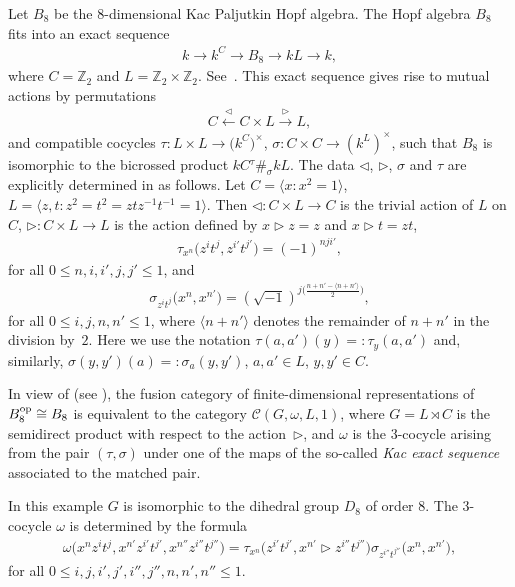 \documentclass[pdftex]{sigma}
\numberwithin{equation}{section}
\newcommand{\C}{{\mathcal C}}
\newcommand{\1}{\textbf{1}}
\begin{document}
\begin{Example}\label{kp}
Let $B_8$ be the 8-dimensional Kac Paljutkin Hopf algebra. The Hopf algebra $B_8$ f\/its into an exact sequence
\begin{gather*}
k \longrightarrow k^C \longrightarrow B_8 \longrightarrow kL \longrightarrow k,
\end{gather*}
where $C = \mathbb Z_2$ and $L = \mathbb Z_2 \times \mathbb Z_2$. See~\cite{masuoka-6-8}. This exact sequence gives rise to mutual actions by permutations
\begin{gather*}C \overset{\vartriangleleft}\longleftarrow C \times L
\overset{\vartriangleright}\longrightarrow L,\end{gather*}
and compatible cocycles $\tau\colon L \times L \to \big(k^C\big)^\times$, $\sigma\colon C \times C \to (k^L)^\times$, such that $B_8$ is isomorphic to the bicrossed product $kC {}^{\tau}\#_\sigma kL$. The data $\lhd$, $\rhd$, $\sigma$ and $\tau$ are explicitly determined in \cite[Proposition~3.11]{ma-contemp} as follows. Let $C = \langle x\colon x^2 = 1 \rangle$, $L = \langle z, t\colon z^2 = t^2 = ztz^{-1}t^{-1} = 1\rangle$. Then $\lhd\colon C\times L \to C$ is the trivial action of $L$ on $C$, $\rhd\colon C \times L \to L$ is the action def\/ined by $x \rhd z = z$ and $x\rhd t = zt$,
\begin{gather*}\tau_{x^n}\big(z^it^j, z^{i'}t^{j'}\big) = (-1)^{nji'},\end{gather*} for all $0\leq n, i, i', j, j' \leq 1$,
and
\begin{gather*}\sigma_{z^it^j}\big(x^n, x^{n'}\big) = (\sqrt{-1})^{j\big(\frac{n+n'-\langle n+n'\rangle}{2}\big)},\end{gather*}
for all $0 \leq i, j, n, n' \leq 1$, where $\langle n+n'\rangle$ denotes the remainder of $n+n'$ in the division by~$2$. Here we use the notation $\tau(a, a')(y) = : \tau_y(a, a')$ and, similarly, $\sigma(y, y')(a) = : \sigma_a(y, y')$, $a, a' \in L$, $y, y' \in C$.

In view of \cite[Theorem~3.3.5]{schauenburg} (see \cite[Proposition~4.3]{gttic}), the fusion category of f\/inite-dimen\-sio\-nal representations of $B_8^{\rm op} \cong B_8$ is equivalent to the category $\C(G, \omega, L, 1)$, where $G = L \rtimes C$ is the semidirect product with respect to the action~$\rhd$, and $\omega$ is the 3-cocycle arising from the pair $(\tau, \sigma)$ under one of the maps of the so-called \emph{Kac exact sequence} associated to the matched pair.

In this example $G$ is isomorphic to the dihedral group $D_8$ of order 8. The 3-cocycle $\omega$ is determined by the formula
\begin{gather}\label{kac}\omega\big(x^{n}z^{i}t^{j}, x^{n'}z^{i'}t^{j'}, x^{n''}z^{i''}t^{j''}\big) =
\tau_{x^n}\big(z^{i'}t^{j'}, x^{n'} \rhd z^{i''}t^{j''}\big) \sigma_{z^{i''}t^{j''}}\big(x^n, x^{n'}\big),\end{gather}
for all $0 \leq i, j, i', j', i'', j'', n, n', n'' \leq 1$.


\end{Example}
\end{document}
